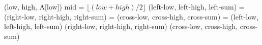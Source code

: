 \begin{algorithmic}
    \State \Return (low, high, A[low])
  \Else
    \State mid = $\lfloor (low + high) / 2 \rfloor$
    \State (left-low, left-high, left-sum) = 
    \State (right-low, right-high, right-sum) = 
    \State (cross-low, cross-high, cross-sum) =  
      \State \Return (left-low, left-high, left-sum)
      \State \Return (right-low, right-high, right-sum)
    \Else
      \State \Return (cross-low, cross-high, cross-sum)
    \EndIf
  \EndIf
\EndFunction
\end{algorithmic}